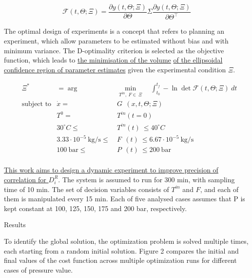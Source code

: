 \documentclass[a0,portrait]{a0poster}
\begin{document}
\begin{multicols}{2}
\begin{tcolorbox}[width=\linewidth, boxrule=0mm, sharp corners=all, colback=white]
\begin{equation*}
	\mathcal{F}(t,\Theta; \Xi) = \frac{\partial y(t, \Theta; \Xi)}{\partial \Theta} \Sigma \frac{\partial y(t, \Theta; \Xi)}{\partial \Theta^\top}
\end{equation*}

The optimal design of experiments is a concept that refers to planning an experiment, which allow parameters to be estimated without bias and with minimum variance. The D-optimality criterion is selected as the objective function, which leads to \underline{the minimisation of the volume} \underline{of the ellipsoidal confidence region of parameter estimates} given the experimental condition $\Xi$. 

\begin{equation*}
	\begin{aligned} 
		&\Xi^* &= \arg &\min_{ T^{in},~F\in~\Xi}\quad\int_{t_0}^{t_f} - \ln \det \mathcal{F}(t,\Theta; \Xi)~dt  \\
		&\text{subject to}
		& \dot{x} = ~&G~~(x,t,\Theta;\Xi) \\
		&& T^{0} = ~&T^{in}(t=0) \\
		&& 30^\circ C \leq ~&T^{in}(t) ~ \leq 40^\circ C \\
		&& 3.33 \cdot 10^{-5}~\text{kg/s} \leq ~&F~~(t)~ \leq 6.67 \cdot 10^{-5}~\text{kg/s}\\
		&& 100~\text{bar} \leq ~&P~~(t)~ \leq 200~\text{bar} \\
	\end{aligned}
\end{equation*}

\underline{This work aims to design a dynamic experiment to improve precision of correlation for $D_i^R$}. The system is assumed to run for 300 min, with sampling time of 10 min. The set of decision variables consists of $T^{in}$ and $F$, and each of them is manipulated every 15 min. Each of five analysed cases assumes that P is kept constant at 100, 125, 150, 175 and 200 bar, respectively.
\end{tcolorbox}
\begin{tcolorbox}[width=\linewidth, boxrule=0mm, sharp corners=all, colback=white]
	{\LARGE Results\\}

	To identify the global solution, the optimization problem is solved multiple times, each starting from a random initial solution. Figure 2 compares the initial and final values of the cost function across multiple optimization runs for different cases of pressure value.
	

\end{tcolorbox}
\end{multicols}
\end{document}

